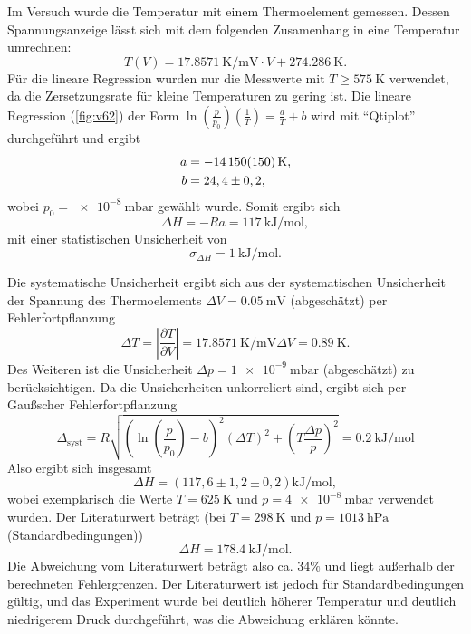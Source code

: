 Im Versuch wurde die Temperatur mit einem Thermoelement gemessen. Dessen Spannungsanzeige lässt sich mit dem folgenden Zusamenhang in eine Temperatur umrechnen:
\begin{equation}
 T(V) = \SI{17,8571}{\kelvin\per\milli\volt} \cdot V + \SI{274,286}{\kelvin}.
\end{equation}
Für die lineare Regression wurden nur die Messwerte mit $T\geq\SI{575}{\kelvin}$ verwendet, da die Zersetzungsrate für kleine Temperaturen zu gering ist. Die lineare Regression (\ref{fig:v62}) der Form $\ln\left(\frac{p}{p_{0}}\right)\left(\frac{1}{T}\right) = \frac{a}{T} + b$ wird mit ``Qtiplot'' durchgeführt und ergibt
\begin{align}
 a &= -\SI{14150\pm150}{\kelvin}, \\
 b &= 24,4 \pm 0,2,
\end{align}
wobei $p_{0}=\SI{e-8}{\milli\bar}$ gewählt wurde. Somit ergibt sich
\begin{equation}
 \Delta H = -Ra = \SI{117}{\kilo\joule\per\mol},
\end{equation}
mit einer statistischen Unsicherheit von
\begin{equation}
 \sigma_{\Delta H} = \SI{1}{\kilo\joule\per\mol}.
\end{equation}

Die systematische Unsicherheit ergibt sich aus der systematischen Unsicherheit der Spannung des Thermoelements $\Delta V=\SI{0,05}{\milli\volt}$ (abgeschätzt) per Fehlerfortpflanzung
\begin{equation}
 \Delta T = \left| \frac{\partial T}{\partial V}\right| = \SI{17,8571}{\kelvin\per\milli\volt} \Delta V = \SI{0,89}{\kelvin}.
\end{equation}
Des Weiteren ist die Unsicherheit $\Delta p=\SI{1e-9}{\milli\bar}$ (abgeschätzt) zu berücksichtigen. Da die Unsicherheiten unkorreliert sind, ergibt sich per Gaußscher Fehlerfortpflanzung
\begin{equation}
 \Delta_{\textrm{syst}} = R \sqrt{\left(\ln\left(\frac{p}{p_{0}}\right)-b\right)^{2}\left(\Delta T\right)^{2} + \left(T\frac{\Delta p}{p}\right)^{2}} = \SI{0,2}{\kilo\joule\per\mol}
\end{equation}
Also ergibt sich insgesamt
\begin{equation}
 \Delta H = (117,6\pm1,2\pm0,2)\si{\kilo\joule\per\mole},
\end{equation}
wobei exemplarisch die Werte $T=\SI{625}{\kelvin}$ und $p=\SI{4e-8}{\milli\bar}$ verwendet wurden.
Der Literaturwert beträgt (bei $T=\SI{298}{\kelvin}$ und $p=\SI{1013}{\hecto\pascal}$ (Standardbedingungen)) \cite{chem}
\begin{equation}
 \Delta H = \SI{178,4}{\kilo\joule\per\mole}.
\end{equation}
Die Abweichung vom Literaturwert beträgt also ca. $34\%$ und liegt außerhalb der berechneten Fehlergrenzen. Der Literaturwert ist jedoch für Standardbedingungen gültig, und das Experiment wurde bei deutlich höherer Temperatur und deutlich niedrigerem Druck durchgeführt, was die Abweichung erklären könnte.


